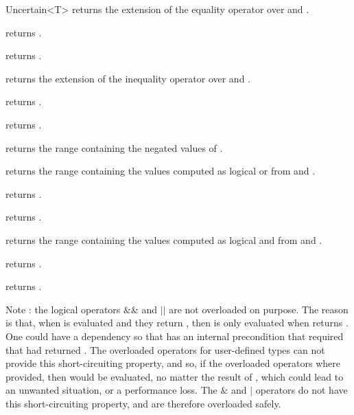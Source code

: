 \begin{ccRefClass}{Uncertain<T>}
  {returns the extension of the equality operator over  and .}

  {returns .}

  {returns .}

  {returns the extension of the inequality operator over  and .}

  {returns .}

  {returns .}


  {returns the range containing the negated values of .}

  {returns the range containing the values computed as logical or from  and .}

  {returns .}

  {returns .}

  {returns the range containing the values computed as logical and from  and .}

  {returns .}

  {returns .}

  Note : the logical operators $\&\&$ and $||$ are not overloaded on purpose.  The reason
  is that, when  is evaluated and they return , then 
  is only evaluated when  returns .  One could have a dependency so
  that  has an internal precondition that required that  had returned .
  The overloaded operators for user-defined types can not provide this short-circuiting
  property, and so, if the overloaded operators where provided, then  would
  be evaluated, no matter the result of , which could lead to an unwanted
  situation, or a performance loss.  The $\&$ and $|$ operators do not have
  this short-circuiting property, and are therefore overloaded safely.


\end{ccRefClass}
